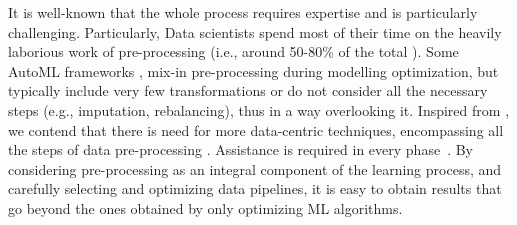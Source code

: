 It is well-known that the whole process requires expertise and is particularly challenging.
Particularly, Data scientists spend most of their time on the heavily laborious work of pre-processing (i.e., around 50-80\% of the total \cite{Munson09Pre}).
Some AutoML frameworks \cite{auto_sklearn, mohr2018ml}, mix-in pre-processing during modelling optimization, but typically include very few transformations or do not consider all the necessary steps (e.g., imputation, rebalancing), thus in a way overlooking it.
Inspired from \cite{Munoz09DOLAP}, we contend that there is need for more data-centric techniques, encompassing all the steps of data pre-processing \cite{Vaisman14Book}.
Assistance is required in every phase~\cite{Bilalli16IOTBD}.
By considering pre-processing as an integral component of the learning process, and carefully selecting and optimizing data pipelines, it is easy to obtain results that go beyond the ones obtained by only optimizing ML algorithms.

